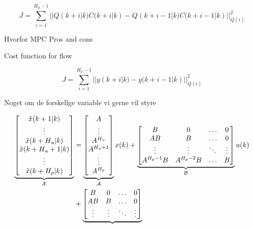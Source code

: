 \begin{equation}
	 J = \sum_{i=1}^{H_p-1} || Q(k+i|k)C(k+i|k)-Q(k+i-1|k)C(k+i-1|k)||_{Q(i)}^2
\end{equation}



Hvorfor MPC
	Pros and cons



Cost function for flow

\begin{equation}
	 J = \sum_{i=1}^{H_p-1} || y(k+i|k)-y(k+i-1|k)||_{Q(i)}^2
\end{equation}


Noget om de forskellge variable vi gerne vil styre



\begin{equation}
\begin{aligned}
	  \underbrace{\begin{bmatrix}
	  \hat{x}(k+1|k) \\
	  \vdots \\
	  \hat{x}(k+H_u|k) \\
	  \hat{x}(k+H_u +1|k) \\
	  \vdots \\
	  \hat{x}(k+H_p|k) \\
	   \end{bmatrix}}_{\CMcal{X}}
	 &=
	\underbrace{\begin{bmatrix}
		A \\
		\vdots \\
		A^{H_u} \\
		A^{H_u+1} \\
		\vdots \\
		A^{H_p} \\
	\end{bmatrix}}_{\CMcal{A}}
	x(k)+
	\underbrace{\begin{bmatrix}
		B 		 &0			&\hdots	& 0		\\
		AB  	 &B  		& \hdots& 0		\\
		\vdots 	 &\vdots	& \ddots&\vdots	\\
		A^{H_p-1}B&A^{H_p-2}B&\hdots &B 
    \end{bmatrix}}_{\CMcal{B}}
    u(k) \\ &+ 
    \underbrace{\begin{bmatrix}
    	B 		 &0			&\hdots	& 0		\\
		AB  	 &B  		& \hdots& 0		\\
		\vdots 	 &\vdots	& \ddots&\vdots	\\

\end{bmatrix}}
\end{aligned}
\end{equation}
